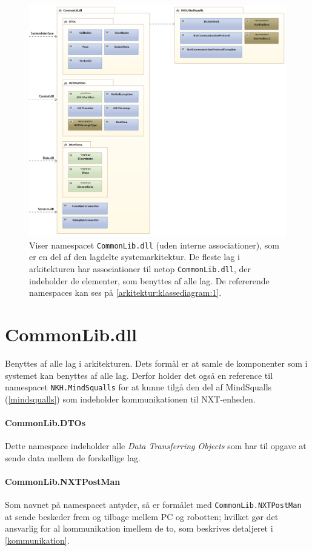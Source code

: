 \begin{figure}
\centering
\includegraphics[width=1\textwidth]{./graphics/systemarkitektur_2}
\caption{Viser namespacet \lstinline!CommonLib.dll! (uden interne associationer), som er en del af den lagdelte systemarkitektur. De fleste lag i arkitekturen har associationer til netop \lstinline!CommonLib.dll!, der indeholder de elementer, som benyttes af alle lag. De refererende namespaces kan ses på \cref{arkitektur:klassediagram:1}.}
\label{arkitektur:klassediagram:2}
\end{figure}
\section{CommonLib.dll}\label{arkitektur:commonlib}
Benyttes af alle lag i arkitekturen.
Dets formål er at samle de komponenter som i systemet kan benyttes af alle lag.
Derfor holder det også en reference til namespacet \lstinline[style=csharp]!NKH.MindSqualls! for at kunne tilgå den del af MindSqualls (\cref{mindsqualls}) som indeholder kommunikationen til NXT-enheden.

\paragraph{CommonLib.DTOs}
Dette namespace indeholder alle \textit{Data Transferring Objects} som har til opgave at sende data mellem de forskellige lag.

\paragraph{CommonLib.NXTPostMan}
Som navnet på namespacet antyder, så er formålet med \lstinline[style=csharp]!CommonLib.NXTPostMan! at sende beskeder frem og tilbage mellem PC og robotten; hvilket gør det ansvarlig for al kommunikation imellem de to, som beskrives detaljeret i \cref{kommunikation}.


